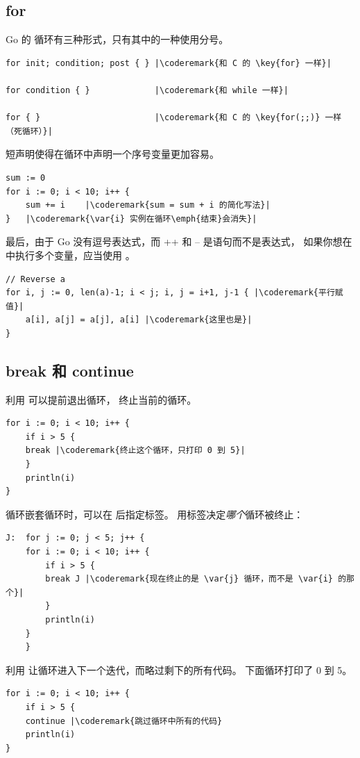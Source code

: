\subsection{for}
\label{sec:for}
Go 的  循环有三种形式，只有其中的一种使用分号。
\begin{lstlisting}
for init; condition; post { } |\coderemark{和 C 的 \key{for} 一样}|

for condition { }             |\coderemark{和 while 一样}|

for { }                       |\coderemark{和 C 的 \key{for(;;)} 一样（死循环）}|
\end{lstlisting}
短声明使得在循环中声明一个序号变量更加容易。
\begin{lstlisting}
sum := 0
for i := 0; i < 10; i++ {
    sum += i	|\coderemark{sum = sum + i 的简化写法}|
}   |\coderemark{\var{i} 实例在循环\emph{结束}会消失}|
\end{lstlisting}
最后，由于 Go 没有逗号表达式，而 ++ 和 -- 是语句而不是表达式，
如果你想在  中执行多个变量，应当使用 。
\begin{lstlisting}
// Reverse a
for i, j := 0, len(a)-1; i < j; i, j = i+1, j-1 { |\coderemark{平行赋值}|
    a[i], a[j] = a[j], a[i] |\coderemark{这里也是}|
}
\end{lstlisting}

\subsection{break 和 continue}
利用  可以提前退出循环， 终止当前的循环。
\begin{lstlisting}
for i := 0; i < 10; i++ {
    if i > 5 {
	break |\coderemark{终止这个循环，只打印 0 到 5}|
    }
    println(i)
}
\end{lstlisting}
循环嵌套循环时，可以在  后指定标签。
用标签决定\emph{哪个}循环被终止：
\begin{lstlisting}
J:  for j := 0; j < 5; j++ {
	for i := 0; i < 10; i++ {
	    if i > 5 { 
		break J	|\coderemark{现在终止的是 \var{j} 循环，而不是 \var{i} 的那个}|
	    }
	    println(i)
	}
    } 
\end{lstlisting}

利用  让循环进入下一个迭代，而略过剩下的所有代码。
下面循环打印了 0 到 5。
\begin{lstlisting}
for i := 0; i < 10; i++ {
    if i > 5 {
	continue |\coderemark{跳过循环中所有的代码}
    println(i)
}
\end{lstlisting}

